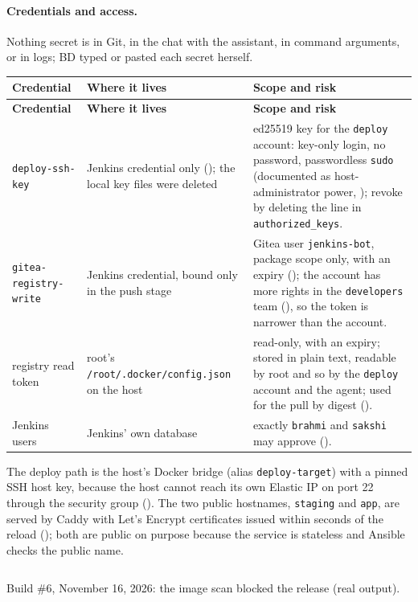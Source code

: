 \paragraph{Credentials and access.} Nothing secret is in Git, in the chat with the assistant, in command arguments, or in logs; BD typed or pasted each secret herself.
\begin{tabularx}{\linewidth}{L{3.2cm}L{3.4cm}Y}
\caption{Credentials of the delivery pipeline\label{Table:DeliveryCredentials}}\\
\toprule \textbf{Credential} & \textbf{Where it lives} & \textbf{Scope and risk}\\ \midrule
\endfirsthead
\toprule \textbf{Credential} & \textbf{Where it lives} & \textbf{Scope and risk}\\ \midrule
\endhead \bottomrule \endlastfoot
\texttt{deploy-ssh-key} & Jenkins credential only (); the local key files were deleted & ed25519 key for the \texttt{deploy} account: key-only login, no password, passwordless \texttt{sudo} (documented as host-administrator power, ); revoke by deleting the line in \texttt{authorized\_keys}.\\
\texttt{gitea-registry-\allowbreak write} & Jenkins credential, bound only in the push stage & Gitea user \texttt{jenkins-bot}, package scope only, with an expiry (); the account has more rights in the \texttt{developers} team (), so the token is narrower than the account.\\
registry read token & root's \texttt{/root/.docker/\allowbreak config.json} on the host & read-only, with an expiry; stored in plain text, readable by root and so by the \texttt{deploy} account and the agent; used for the pull by digest ().\\
Jenkins users & Jenkins' own database & exactly \texttt{brahmi} and \texttt{sakshi} may approve ().\\
\end{tabularx}
The deploy path is the host's Docker bridge (alias \texttt{deploy-target}) with a pinned SSH host key, because the host cannot reach its own Elastic IP on port 22 through the security group (). The two public hostnames, \texttt{staging} and \texttt{app}, are served by Caddy with
Let's Encrypt certificates issued within seconds of the reload (); both are public on purpose because the service is stateless and Ansible checks the public name.

\begin{longlisting}
\inputminted[fontsize=\scriptsize]{text}{evidence/213-build-6-image-scan-gate-blocked-the-release-bd-2026-11-16.txt}
\caption{Build \#6, November 16, 2026: the image scan blocked the release (real output).}
\label{Listing:E213}
\end{longlisting}

